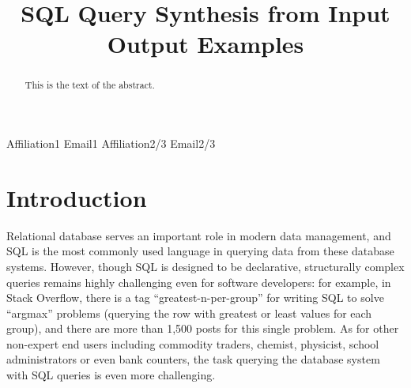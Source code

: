 \documentclass[preprint]{sigplanconf}
\begin{document}
\setlength{\pdfpageheight}{\paperheight}
\setlength{\pdfpagewidth}{\paperwidth}




\title{SQL Query Synthesis from Input Output Examples}

           {Affiliation1}
           {Email1}
           {Affiliation2/3}
           {Email2/3}

\maketitle

\begin{abstract}
This is the text of the abstract.
\end{abstract}




\section{Introduction}

Relational database serves an important role in modern data management, and SQL is the most commonly used language in querying data from these database systems. However, though SQL is designed to be declarative, structurally complex queries remains highly challenging even for software developers: for example, in Stack Overflow, there is a tag ``greatest-n-per-group'' for writing SQL to solve ``argmax'' problems (querying the row with greatest or least values for each group), and there are more than 1,500 posts for this single problem. As for other non-expert end users including commodity traders, chemist, physicist, school administrators or even bank counters, the task querying the database system with SQL queries is even more challenging.
\end{document}
